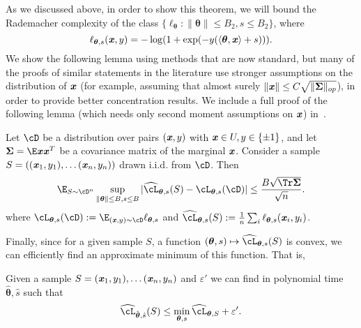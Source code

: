 As we discussed above, in order to show this theorem, we will bound the Rademacher complexity of the class $\{ \ell_{\boldsymbol{\theta}}: \|\boldsymbol{\theta}\| \leq B_2, s \leq B_2\}$, where
\begin{equation}
    \ell_{\boldsymbol{\theta},s}(\boldsymbol{\mathit{x}}, y) = -\log(1 + \exp(-y(\langle \boldsymbol{\theta}, \boldsymbol{\mathit{x}}\rangle + s))).
\end{equation}
We show the following lemma using methods that are now standard, but many of the proofs of similar statements in the literature use stronger assumptions on the distribution of $\boldsymbol{\mathit{x}}$ (for example, assuming that almost surely $\|\boldsymbol{\mathit{x}}\| \leq C \sqrt{\|\boldsymbol{\Sigma}\|_{op}}$), in order to provide better concentration results. We include a full proof of the following lemma (which needs only second moment assumptions on $\boldsymbol{\mathit{x}}$) in~.
\begin{lemma}
    \label{lem:rademacher-complexity-log-reg}
    Let $\cD$ be a distribution over pairs $(\boldsymbol{\mathit{x}}, y)$ with $\boldsymbol{\mathit{x}} \in U, y \in \{\pm 1\}$, and let $\boldsymbol{\Sigma} = \E \xx \xx^T$ be a covariance matrix of the marginal $\boldsymbol{\mathit{x}}$. Consider a sample $S = ((\boldsymbol{\mathit{x}}_1, y_1), \ldots (\boldsymbol{\mathit{x}}_n, y_n))$ drawn i.i.d. from $\cD$.  Then
    \begin{equation*}
        \E_{S \sim \cD^n} \sup_{\|\boldsymbol{\theta}\| \leq B, s \leq B} |\widehat{\cL}_{\boldsymbol{\theta}, s}(S) - \cL_{\boldsymbol{\theta}, s}(\cD)|\leq \frac{B \sqrt{\Tr\boldsymbol{\Sigma}}}{\sqrt{n}}.
    \end{equation*}
    where $\cL_{\boldsymbol{\theta}, s}(\cD) := \E_{(\xx, y)\sim \cD} \ell_{\boldsymbol{\theta}, s}$ and $\widehat{\cL}_{\boldsymbol{\theta}, s}(S) := \frac{1}{n} \sum_i \ell_{\boldsymbol{\theta}, s}(\xx_i, y_i)$.
\end{lemma}

Finally, since for a given sample $S$, a function $(\boldsymbol{\theta}, s) \mapsto \widehat{\cL}_{\boldsymbol{\theta}, s}(S)$ is convex, we can efficiently find an approximate minimum of this function. That is,
\begin{fact}
\label{fact:log-reg-optimization}
    Given a sample $S = (\boldsymbol{\mathit{x}}_1, y_1), \ldots (\boldsymbol{\mathit{x}}_n, y_n)$ and $\varepsilon'$ we can find in polynomial time $\hat{\boldsymbol{\theta}}, \hat{s}$ such that
    \begin{equation*}
        \widehat{\cL}_{\hat{\boldsymbol{\theta}}, \hat{s}}(S) \leq \min_{\boldsymbol{\theta}, s} \widehat{\cL}_{\boldsymbol{\theta}, S} + \varepsilon'.
    \end{equation*}
\end{fact}

